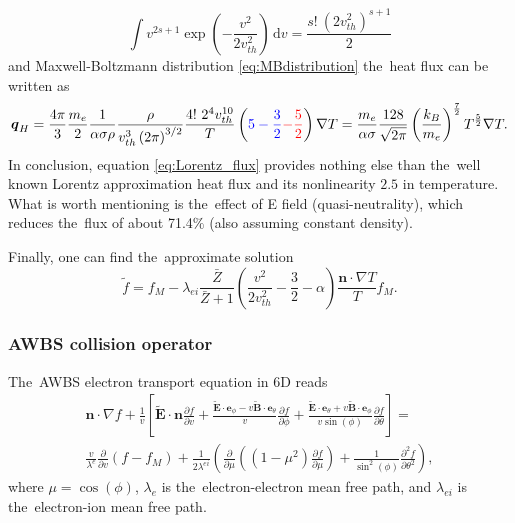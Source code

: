 \documentclass[preprint,12pt]{elsarticle}
\newcommand{\pdv}[2]{\frac{\partial{#1}}{\partial{#2}}}
\newcommand{\vect}[1]{\boldsymbol{#1}}
\newcommand{\dI}{\text{d}}
\newcommand{\mfpe}{\lambda_e}
\newcommand{\mfpei}{\lambda_{ei}}
\newcommand{\Zbar}{\bar{Z}}
\newcommand{\vmag}{v}
\newcommand{\vth}{v_{th}}
\newcommand{\vn}{\vect{n}}
\newcommand{\tE}{\vect{\tilde{E}}}
\newcommand{\tB}{\vect{\tilde{B}}}
\newcommand{\me}{m_e}
\newcommand{\kB}{k_B}
\newcommand{\crs}{\sigma}
\newcommand{\fM}{f_M}
\newcounter{bla}
\begin{document}
\begin{equation}
  \int \vmag^{2s+1} \exp\left(-\frac{\vmag^2}{2\vth^2}\right)\, \dI\vmag = 
  \frac{s!~(2 \vth^2)^{s+1}}{2}
  \nonumber 
\end{equation}
and Maxwell-Boltzmann distribution \eqref{eq:MBdistribution} the~heat flux can 
be written as
\begin{equation}
  \vect{q}_H = \frac{4\pi}{3}\frac{\me}{2}\frac{1}{\alpha \crs\rho}
  \frac{\rho}{\vth^3 \left( 2 \pi \right)^{3/2}}
  \frac{4!~2^4 \vth^{10}}{T} \left( 
  \textcolor{blue}{
  5 - \frac{3}{2}
  }
  \textcolor{red}{
  - \frac{5}{2}
  }
  \right) \nabla T 
  = \frac{\me}{\alpha \crs}\frac{128}{\sqrt{2 \pi}}
  \left(\frac{\kB}{\me}\right)^{\frac{7}{2}}T^{\frac{5}{2}} \nabla T .
  \label{eq:Lorentz_flux}
\end{equation} 
In conclusion, equation \eqref{eq:Lorentz_flux} provides nothing else than
the~well known Lorentz approximation heat flux and its nonlinearity $2.5$
in temperature. What is worth mentioning is the~effect of E field 
(quasi-neutrality), which reduces the~flux of about	71.4$\%$ 
(also assuming constant density).


Finally, one can find the~approximate solution
\begin{equation}
  \tilde{f} = \fM - \mfpei\frac{\Zbar}{\Zbar+1}
  \left( \frac{\vmag^2}{2 \vth^2} - \frac{3}{2} - \alpha\right)
  \frac{\vn\cdot\nabla T}{T}\fM .
  \label{eq:BGK_approximate_solution}
\end{equation}


\subsubsection{AWBS collision operator}\label{sec:AWBS_cop}
The~AWBS electron transport equation in 6D reads
\begin{multline}
  \vn\cdot\nabla f + \frac{1}{\vmag} \left[ \tE\cdot\vn \pdv{f}{\vmag} 
  + \frac{\tE\cdot\vect{e}_\phi 
  - \vmag\tB\cdot\vect{e}_\theta}{\vmag}\pdv{f}{\phi}
  + \frac{\tE\cdot\vect{e}_\theta + \vmag\tB\cdot\vect{e}_\phi}
  {\vmag\sin(\phi)}\pdv{f}{\theta} \right] 
  =\\
  \frac{\vmag}{\lambda^e}\pdv{}{\vmag}\left(f - f_M\right) 
  + \frac{1}{2 \lambda^{ei}} 
  \left(\pdv{}{\mu}\left((1 - \mu^2)\pdv{f}{\mu}\right)
  + \frac{1}{\sin^2(\phi)}\frac{\partial^2f}{\partial\theta^2} \right) ,
  \label{eq:AWBS_spherical}
\end{multline}
where $\mu = \cos(\phi)$, $\mfpe$ is the~electron-electron mean free path, and
$\mfpei$ is the~electron-ion mean free path.
\end{document}
